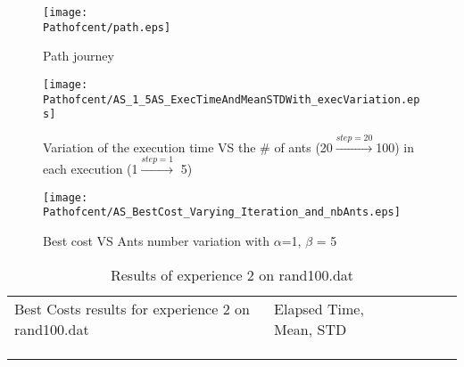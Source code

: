 \begin{figure}[H]
	\begin{minipage}[t]{0.45\linewidth}
	\centering
	\texttt{[image: \\Pathofcent/path.eps]}
	\caption{Path journey}\label{fig:Pathofcent:path}
	
	\end{minipage}\hfill
	\begin{minipage}[t]{0.45\linewidth}
	\centering
	\texttt{[image: \\Pathofcent/AS\_1\_5AS\_ExecTimeAndMeanSTDWith\_execVariation.eps]}
	\caption{Variation of the execution time VS the \# of ants (20$\stackrel{step=20}{\rightarrow}$100) in each execution (1$\stackrel{step=1}{\rightarrow}$ 5)}
	\label{fig:Pathofcent:AS_1_5AS_ExecTimeAndMeanSTDWith_execVariation}
	\end{minipage}
	\flushleft
	\begin{minipage}[t]{0.45\linewidth}
	\centering
	\texttt{[image: \\Pathofcent/AS\_BestCost\_Varying\_Iteration\_and\_nbAnts.eps]}
	\caption{Best cost VS Ants number variation with $\alpha$=1, $ \beta $ = 5}
	\label{fig:Pathofcent:AS_BestCost_Varying_Iteration_and_nbAnts}
	\end{minipage}
\end{figure}
	\begin{minipage}[t]{0.9\linewidth}
	\vspace{-9mm}
	\begin{table}[H]
	\label{tab:Pathofcent:expdeux}
	\begin{tabular}{lllll}
	\cline{1-2}
	\multicolumn{1}{|l|}{Best Costs results for experience 2 on rand100.dat }                                                           &  \multicolumn{1}{l|}{Elapsed Time, Mean, STD}                                             &  &  &  \\ \cline{1-2}
	\multicolumn{1}{|l|}{} & \multicolumn{1}{l|}{ } &  &  &  \\ \cline{1-2}
	&     &  &  &  \\
	&     &  &  & 
	\end{tabular}
	\caption{Results of experience 2 on rand100.dat}
	\end{table}
	\end{minipage}